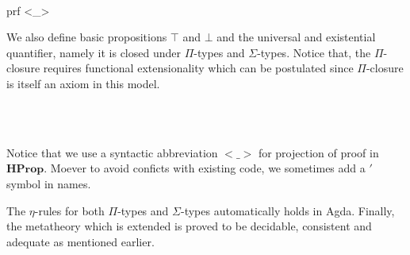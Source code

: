 \begin{code}\>\<%
\\
\>  \AgdaSymbol{:}  \<%
\\
\>[0]\<[2]%
\>[2] \<%
\\
\>[0]\<[2]%
\>[2]\<%
\\
\>[2]\<[4]%
\>[4] \AgdaSymbol{:} \<%
\\
\>[2]\<[4]%
\>[4] \AgdaSymbol{:} \AgdaSymbol{\{}  \AgdaSymbol{:} \AgdaSymbol{\}}    \<%
\\
\>    \AgdaSymbol{(}prf  <\_>\AgdaSymbol{)}\<%
\end{code}

We also define basic propositions $\top$ and $\bot$ and the universal and existential quantifier, namely it is closed under $\Pi$-types and $\Sigma$-types. Notice that, the $\Pi$-closure requires functional extensionality which can be postulated since $\Pi$-closure is itself an axiom in this model.

\begin{code}\>\<
%
\\
\> \AgdaSymbol{:} \AgdaSymbol{(} \AgdaSymbol{:} \AgdaSymbol{)(} \AgdaSymbol{:}   \AgdaSymbol{)}  \<%
\\
\>   \AgdaSymbol{=}  \AgdaSymbol{((} \AgdaSymbol{:} \AgdaSymbol{)}  \AgdaFunction{<}   \AgdaFunction{>}\AgdaSymbol{)} \AgdaSymbol{(}     \AgdaSymbol{(} \AgdaSymbol{)))}\<%
\>\<\end{code}

Notice that we use a syntactic abbreviation $<\_>$ for projection of proof in $\textbf{HProp}$. Moever to avoid conficts with existing code, we sometimes add a $'$ symbol in names. 

The $\eta$-rules for both $\Pi$-types and $\Sigma$-types automatically holds in Agda. Finally, the metatheory which is extended is proved to be decidable, consistent and adequate as mentioned earlier.

